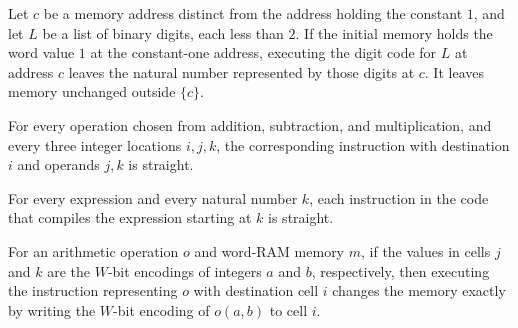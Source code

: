 \begin{theorem}
\label{Light.Compiler.effects_digitsCode}
\leanok
{}
Let $c$ be a memory address distinct from the address holding the constant $1$, and let
$L$ be a list of binary digits, each less than $2$. If the initial memory holds the word
value $1$ at the constant-one address, executing the digit code for $L$ at address $c$
leaves the natural number represented by those digits at $c$. It leaves memory unchanged
outside $\{c\}$.
\end{theorem}

\begin{theorem}
\label{Light.Compiler.straight_instr}
\leanok
{}
For every operation chosen from addition, subtraction, and multiplication, and every
three integer locations $i,j,k$, the corresponding instruction with destination $i$ and
operands $j,k$ is straight.
\end{theorem}

\begin{theorem}
\label{Light.Compiler.straight_compileExpr}
\leanok
{}
For every expression and every natural number $k$, each instruction in the code that
compiles the expression starting at $k$ is straight.
\end{theorem}

\begin{theorem}
\label{Light.Compiler.effect_instr}
\leanok
{}
For an arithmetic operation $o$ and word-RAM memory $m$, if the values in cells $j$ and
$k$ are the $W$-bit encodings of integers $a$ and $b$, respectively, then executing the
instruction representing $o$ with destination cell $i$ changes the memory exactly by
writing the $W$-bit encoding of $o(a,b)$ to cell $i$.
\end{theorem}

